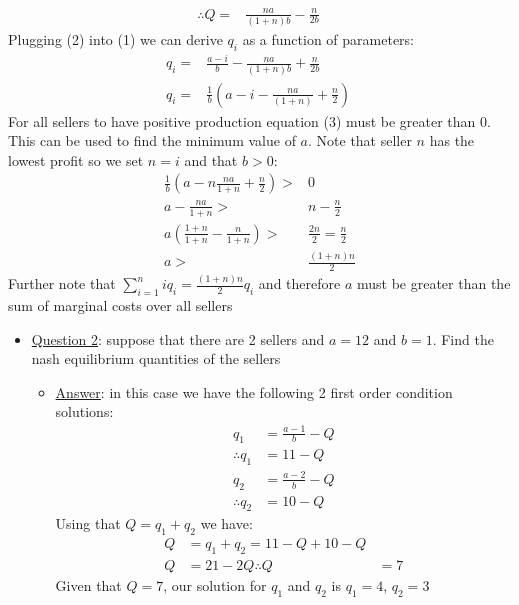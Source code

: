 \documentclass{article}
\begin{document}
\begin{itemize}
\begin{itemize}
\begin{align*}
        \therefore Q =& \frac{na}{(1+n)b} - \frac{n}{2b} \ \tag{2}
      \end{align*}
      Plugging (2) into (1) we can derive $q_{i}$ as a function of parameters:
      \begin{align*}
        q_{i} =& \frac{a-i}{b} - \frac{na}{(1+n)b} + \frac{n}{2b} \\
        q_{i} =& \frac{1}{b} (a - i - \frac{na}{(1+n)} + \frac{n}{2}) \ \tag{3}
      \end{align*}
      For all sellers to have positive production equation (3) must be greater than 0. This can be used to find the minimum value of $a$. Note that seller $n$ has the lowest profit so we set $n=i$ and that $b > 0$:
      \begin{align*}
        \frac{1}{b} ( a - n \frac{na}{1 + n} + \frac{n}{2}) >& 0 \\
        a - \frac{na}{1+n} >& n - \frac{n}{2} \\
        a(\frac{1+n}{1+n} - \frac{n}{1+n}) >& \frac{2n}{2} = \frac{n}{2} \\
        a >& \frac{(1+n)n}{2}
      \end{align*}
      Further note that $\sum_{i=1}^{n}iq_{i} = \tfrac{(1+n)n}{2}q_{i}$ and therefore $a$ must be greater than the sum of marginal costs over all sellers
    \end{itemize}
  \end{itemize}
  \begin{itemize}
    \item  \underline{Question 2}: suppose that there are 2 sellers and $a=12$ and $b=1$. Find the nash equilibrium quantities of the sellers
    \begin{itemize}
      \item  \underline{Answer}: in this case we have the following 2 first order condition solutions:
      \begin{align*}
        q_{1} &= \frac{a-1}{b} - Q \\
        \therefore q_{1} &= 11 - Q \\
        q_{2} &= \frac{a - 2}{b} - Q \\
        \therefore q_{2} &= 10 - Q
      \end{align*}
      Using that $Q = q_{1} + q_{2}$ we have:
      \begin{align*}
        Q &= q_{1} + q_{2} = 11 - Q + 10 - Q \\
        Q &= 21 - 2Q
        \therefore Q &= 7
      \end{align*}
      Given that $Q=7$, our solution for $q_{1}$ and $q_{2}$ is $q_{1} = 4$,  $q_{2} = 3$
    \end{itemize}
  \end{itemize}
\end{document}
